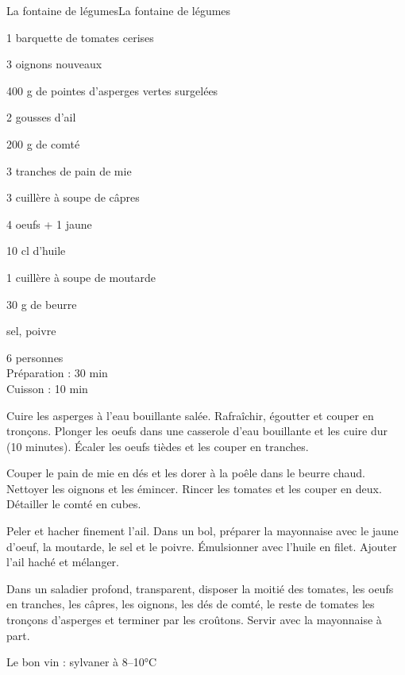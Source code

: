 \begin{recette}{La fontaine de légumes}{La fontaine de légumes}
\begin{ingredients}
 1 barquette de tomates cerises \par
 3 oignons nouveaux \par
 400 g de pointes d'asperges vertes surgelées \par
 2 gousses d'ail \par
 200 g de comté \par
 3 tranches de pain de mie \par
 3 cuillère à soupe de câpres \par
 4 oeufs + 1 jaune \par
 10 cl d'huile \par
 1 cuillère à soupe de moutarde \par
 30 g de beurre \par
 sel, poivre
\end{ingredients}
\begin{infos}
 6 personnes\\		%
 Préparation : 30 min\\		%
 Cuisson : 10 min			%
\end{infos}
\begin{etapes}
\item Cuire les asperges à l'eau bouillante salée. Rafraîchir, égoutter et couper en tronçons. Plonger les oeufs dans une casserole d'eau bouillante et les cuire dur (10 minutes). Écaler les oeufs tièdes et les couper en tranches.
\item Couper le pain de mie en dés et les dorer à la poêle dans le beurre chaud. Nettoyer les oignons et les émincer. Rincer les tomates et les couper en deux. Détailler le comté en cubes.
\item Peler et hacher finement l'ail.
Dans un bol, préparer la mayonnaise avec le jaune d'oeuf, la moutarde, le sel et le poivre. Émulsionner avec l'huile en filet.
Ajouter l'ail haché et mélanger.
\item Dans un saladier profond, transparent, disposer la moitié des tomates, les oeufs en tranches, les câpres, les oignons, les dés de comté, le reste de tomates les tronçons d'asperges et terminer par les croûtons.
Servir avec la mayonnaise à part.
\end{etapes}
\begin{conseils}
Le bon vin : sylvaner à 8--10°C
\end{conseils}
	
\end{recette}